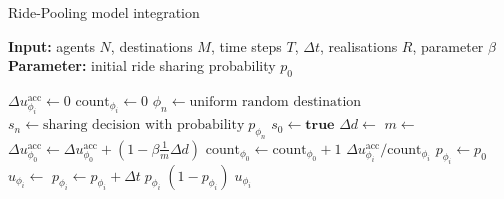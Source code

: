 \documentclass[aps,pra,showpacs,preprintnumbers,amsmath,amssymb,nofootinbib]{revtex4-2}
\begin{document}
    \begin{algorithm}[H]
        \caption{Ride-Pooling model integration}
        \label{alg:ride-pooling}
        \textbf{Input:} agents $N$, destinations $M$, time steps $T$, $\Delta t$, realisations $R$, parameter $\beta$ \\
        \textbf{Parameter:} initial ride sharing probability $p_0$ 

        \begin{algorithmic}[1]
                \State $\Delta u^{\text{acc}} _{\phi_i} \leftarrow 0$ 
                \State $\text{count}_{\phi_i} \leftarrow 0$
                    \State $\phi_n \leftarrow \text{uniform random destination}$ 
                    \State $s_n \leftarrow \text{sharing decision with probability} \;p_{\phi_n}$ 
                    \State $s_0 \leftarrow \textbf{true}$ 
                    \State $\Delta d \leftarrow $  
                    \State $m \leftarrow $ 
                    \State $\Delta u^{\text{acc}}_{\phi_0} \leftarrow \Delta u^{\text{acc}}_{\phi_0} + (1 - \beta \frac{1}{m} \Delta d)$ 
                    \State $\text{count}_{\phi_0} \leftarrow \text{count}_{\phi_0} + 1$
                \EndFor
                \State \Return $\Delta u^{\text{acc}}_{\phi_i} / \text{count}_{\phi_i}$
            \EndProcedure
            \Statex
            \State $p_{\phi_i} \leftarrow p_0$
                \State $u_{\phi_i} \leftarrow$ 
                \State $p_{\phi_i} \leftarrow p_{\phi_i} + \Delta t \; p_{\phi_i} \; (1 - p_{\phi_i}) \; u_{\phi_i}$
            \EndFor
        \end{algorithmic}
    \end{algorithm}
\end{document}
